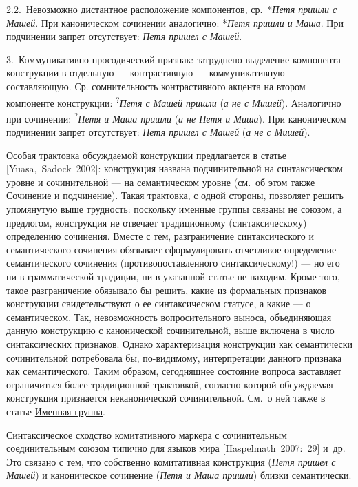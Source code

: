 2.2.~Невозможно дистантное расположение компонентов, ср.~*\textit{Петя
пришли с Машей}. При каноническом сочинении аналогично: *\textit{Петя
пришли и Маша}. При подчинении запрет отсутствует: \textit{Петя пришел с
Машей}.

3.~Коммуникативно-просодический признак: затруднено выделение компонента
конструкции в отдельную --- контрастивную --- коммуникативную
составляющую. Ср. сомнительность контрастивного акцента на втором
компоненте конструкции: \textsuperscript{?}\textit{Петя с Машей пришли}
(\textit{а не с Мишей}). Аналогично при сочинении:
\textsuperscript{?}\textit{Петя и Маша пришли} (\textit{а не Петя и Миша}).
При каноническом подчинении запрет отсутствует: \textit{Петя пришел с
Машей} (\textit{а не с Мишей}).

Особая трактовка обсуждаемой конструкции предлагается в статье
{[}Yuasa,~Sadock~2002{]}: конструкция названа подчинительной на
синтаксическом уровне и сочинительной --- на семантическом уровне (см.~об
этом также \underline{Сочинение и подчинение}). Такая трактовка, с одной
стороны, позволяет решить упомянутую выше трудность: поскольку именные
группы связаны не союзом, а предлогом, конструкция не отвечает
традиционному (синтаксическому) определению сочинения. Вместе с тем,
разграничение синтаксического и семантического сочинения обязывает
сформулировать отчетливое определение семантического сочинения
(противопоставленного синтаксическому!) --- но его ни в грамматической
традиции, ни в указанной статье не находим. Кроме того, такое
разграничение обязывало бы решить, какие из формальных признаков
конструкции свидетельствуют о ее синтаксическом статусе, а какие --- о
семантическом. Так, невозможность вопросительного выноса, объединяющая
данную конструкцию с канонической сочинительной, выше включена в число
синтаксических признаков. Однако характеризация конструкции как
семантически сочинительной потребовала бы, по-видимому, интерпретации
данного признака как семантического. Таким образом, сегодняшнее
состояние вопроса заставляет ограничиться более традиционной трактовкой,
согласно которой обсуждаемая конструкция признается неканонической
сочинительной. См.~о ней также в статье \underline{Именная группа}.

Синтаксическое сходство комитативного маркера с сочинительным
соединительным союзом типично для языков мира {[}Haspelmath~2007:~29{]}
и~др. Это связано с тем, что собственно комитативная конструкция
(\textit{Петя пришел с Машей}) и каноническое сочинение (\textit{Петя и Маша
пришли}) близки семантически.

